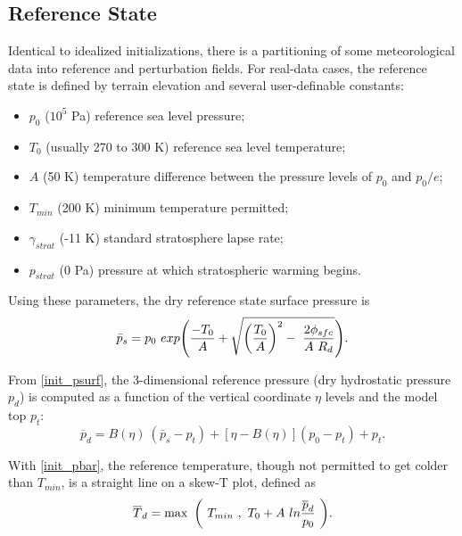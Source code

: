 \subsection{Reference State}
\label{initialization_real_base_section}
Identical to idealized initializations, there is a partitioning of some 
meteorological data into reference and perturbation fields.
For real-data cases, the reference state is defined by terrain elevation and several user-definable constants:
\begin{itemize}\setlength{\parskip}{-5pt}
\item $p_{0}$ ($10^5$ Pa) reference sea level pressure; 
\item $T_{0}$ (usually 270 to 300 K) reference sea level temperature; 
\item $A$ (50 K) temperature difference between the pressure levels of $p_{0}$ and $p_{0}/e$;
\item $T_{min}$ (200 K) minimum temperature permitted; 
\item $\gamma_{strat}$ (-11 K) standard stratosphere lapse rate;
\item $p_{strat}$ (0 Pa) pressure at which stratospheric warming begins.
\end{itemize}

\noindent Using these parameters, the dry reference state surface pressure is
\begin{equation}
\bar p_{s} = p_{0}~exp\Bigg({-T_{0} \over A} + 
                     \sqrt{ {\bigg( {T_{0} \over A } \bigg)}^2 - ~
                            { 2\phi_{sfc} \over { A~R_d}} } \Bigg).
\label{init_psurf}
\end{equation}

\noindent From \eqref{init_psurf}, the 3-dimensional reference pressure (dry hydrostatic pressure $p_{d}$)
is computed as
a function of the vertical coordinate $\eta$ levels and the model top $p_{t}$:
\begin{equation}
\overline{p}_d = B(\eta) ~( \bar p_{s} - p_{t} ) +[\eta-B(\eta)](p_0-p_t) + p_{t}.
\label{init_pbar}
\end{equation}

\noindent With \eqref{init_pbar}, the reference temperature, though not permitted to get
colder than $T_{min}$, is a straight line on a skew-T plot, defined as
\begin{equation}
\overline{T}_d = \max~\bigg(~T_{min}~,~ T_0 + A~ln {\overline{p}_d \over p_0}~\bigg).
\notag
\end{equation}

